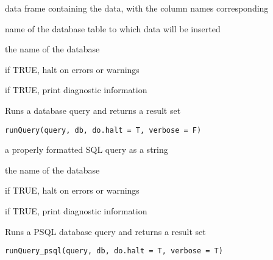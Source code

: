 \documentclass[letterpaper]{book}
\begin{document}
%
\begin{Arguments}
\begin{ldescription}
\item[\code{mat}] data frame containing the data, with the column names corresponding

\item[\code{table}] name of the database table to which data will be inserted

\item[\code{db}] the name of the database

\item[\code{do.halt}] if TRUE, halt on errors or warnings

\item[\code{verbose}] if TRUE, print diagnostic information
\end{ldescription}
\end{Arguments}
%
\begin{Description}\relax
Runs a database query and returns a result set
\end{Description}
%
\begin{Usage}
\begin{verbatim}
runQuery(query, db, do.halt = T, verbose = F)
\end{verbatim}
\end{Usage}
%
\begin{Arguments}
\begin{ldescription}
\item[\code{query}] a properly formatted SQL query as a string

\item[\code{db}] the name of the database

\item[\code{do.halt}] if TRUE, halt on errors or warnings

\item[\code{verbose}] if TRUE, print diagnostic information
\end{ldescription}
\end{Arguments}
%
\begin{Description}\relax
Runs a PSQL database query and returns a result set
\end{Description}
%
\begin{Usage}
\begin{verbatim}
runQuery_psql(query, db, do.halt = T, verbose = T)
\end{verbatim}
\end{Usage}
\end{document}
